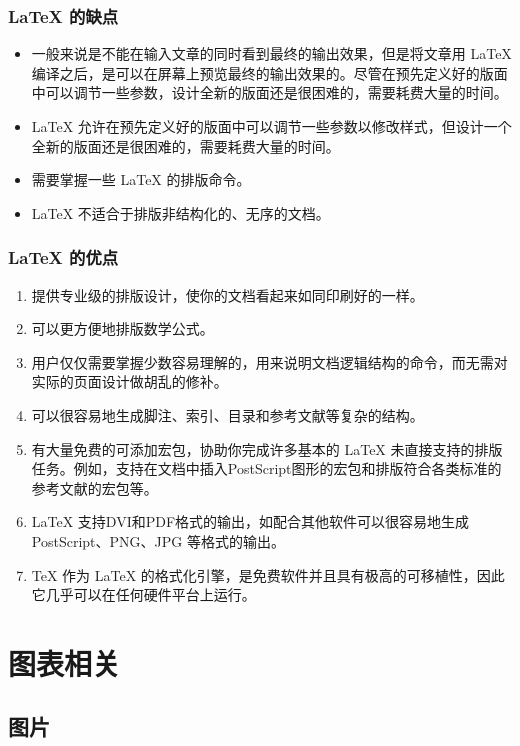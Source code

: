 \documentclass[report,oneside,UTF8,zihao=-4]{config}
\begin{document}
\subsection{\LaTeX{} 的缺点}

\begin{itemize}
    \item 一般来说是不能在输入文章的同时看到最终的输出效果，但是将文章用 \LaTeX{} 编译之后，是可以在屏幕上预览最终的输出效果的。尽管在预先定义好的版面中可以调节一些参数，设计全新的版面还是很困难的，需要耗费大量的时间。
    \item \LaTeX{} 允许在预先定义好的版面中可以调节一些参数以修改样式，但设计一个全新的版面还是很困难的，需要耗费大量的时间。
    \item 需要掌握一些 \LaTeX{} 的排版命令。
    \item \LaTeX{} 不适合于排版非结构化的、无序的文档。
\end{itemize}

\subsection{\LaTeX{} 的优点}

\begin{enumerate}
    \item 提供专业级的排版设计，使你的文档看起来如同印刷好的一样。
    \item 可以更方便地排版数学公式。
    \item 用户仅仅需要掌握少数容易理解的，用来说明文档逻辑结构的命令，而无需对实际的页面设计做胡乱的修补。
    \item 可以很容易地生成脚注、索引、目录和参考文献等复杂的结构。
    \item 有大量免费的可添加宏包，协助你完成许多基本的 \LaTeX{} 未直接支持的排版任务。例如，支持在文档中插入PostScript图形的宏包和排版符合各类标准的参考文献的宏包等。
    \item \LaTeX{} 支持DVI和PDF格式的输出，如配合其他软件可以很容易地生成 PostScript、PNG、JPG 等格式的输出。
    \item \TeX{} 作为 \LaTeX{} 的格式化引擎，是免费软件并且具有极高的可移植性，因此它几乎可以在任何硬件平台上运行。
\end{enumerate}

\chapter{图表相关}

\section{图片}
\end{document}

